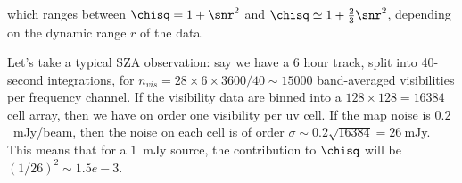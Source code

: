 which ranges between $\chisq = 1 + \snr^2$ and $\chisq \simeq 1 + {2\over{3}}\snr^2$, depending on the dynamic range $r$ of the data.

Let's take a typical SZA observation: say we have a 6 hour track,
split into 40-second integrations, for $n_{vis} = 28 \times 6 \times
3600/40 \sim 15000$ band-averaged visibilities per frequency channel.
If the visibility data are binned into a $128\times128 = 16384$ cell
array, then we have on order one visibility per uv cell.  If the map
noise is $0.2$~mJy/beam, then the noise on each cell is of order
$\sigma \sim 0.2 \sqrt{16384} = 26~$mJy.  This means that for a
$1$~mJy source, the contribution to $\chisq$ will be $(1/26)^2 \sim 1.5e-3$.

